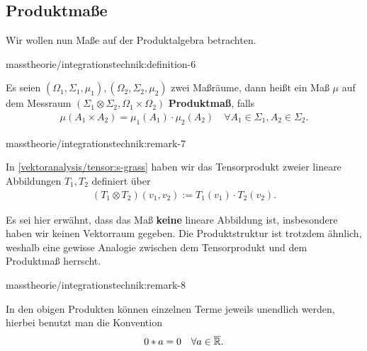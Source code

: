 \subsection{Produktmaße}
\label{\detokenize{masstheorie/integrationstechnik:produktmasze}}
\par
Wir wollen nun Maße auf der Produktalgebra betrachten.
\begin{definition}{}{masstheorie/integrationstechnik:definition-6}



\par
Es seien \((\Omega_1,\Sigma_1,\mu_1), (\Omega_2,\Sigma_2,\mu_2)\) zwei Maßräume, dann heißt ein Maß \(\mu\) auf dem Messraum \((\Sigma_1\otimes\Sigma_2, \Omega_1\times\Omega_2)\) \textbf{Produktmaß}, falls
\begin{align*}
\mu(A_1\times A_2) = \mu_1(A_1)\cdot\mu_2(A_2)\quad\forall A_1\in\Sigma_1, A_2\in\Sigma_2.
\end{align*}\end{definition}
\begin{remark}{}{masstheorie/integrationstechnik:remark-7}



\par
In \cref{vektoranalysis/tensor:s-grass}  haben wir das Tensorprodukt zweier lineare Abbildungen \(T_1,T_2\) definiert über
\begin{align*}
(T_1\otimes T_2)(v_1,v_2) := T_1(v_1)\cdot T_2(v_2).
\end{align*}
\par
Es sei hier erwähnt, dass das Maß \textbf{keine} lineare Abbildung ist, insbesondere haben wir keinen Vektorraum gegeben. Die Produktstruktur ist trotzdem ähnlich, weshalb eine gewisse Analogie zwischen dem Tensorprodukt und dem Produktmaß herrscht.
\end{remark}
\begin{remark}{}{masstheorie/integrationstechnik:remark-8}



\par
In den obigen Produkten können einzelnen Terme jeweils unendlich werden, hierbei benutzt man die Konvention
\begin{align*}
0 * a = 0\quad\forall a\in\overline{\mathbb{R}}.
\end{align*}\end{remark}


